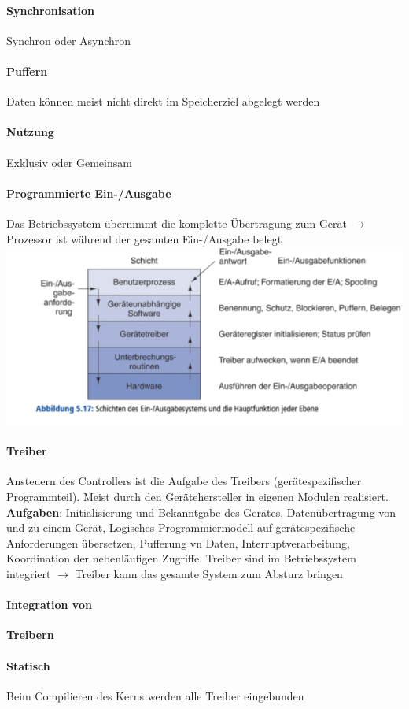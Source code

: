 \documentclass[11pt,a4paper,landscape]{article}
\begin{document}
\begin{multicols*}{3}
	\paragraph{Synchronisation} Synchron oder Asynchron
	\paragraph{Puffern} Daten können meist nicht direkt im Speicherziel abgelegt werden
	\paragraph{Nutzung} Exklusiv oder Gemeinsam
	\paragraph{Programmierte Ein-/Ausgabe} Das Betriebssystem übernimmt die komplette Übertragung zum Gerät $\rightarrow$ Prozessor ist während der gesamten Ein-/Ausgabe belegt\\
	\includegraphics[width=0.95\columnwidth]{einausgabe}
	\paragraph{Treiber} Ansteuern des Controllers ist die Aufgabe des Treibers (gerätespezifischer Programmteil). Meist durch den Gerätehersteller in eigenen Modulen realisiert. \textbf{Aufgaben}: Initialisierung und Bekanntgabe des Gerätes, Datenübertragung von und zu einem Gerät, Logisches Programmiermodell auf gerätespezifische Anforderungen übersetzen, Pufferung vn Daten, Interruptverarbeitung, Koordination der nebenläufigen Zugriffe. Treiber sind im Betriebssystem integriert $\rightarrow$ Treiber kann das gesamte System zum Absturz bringen
	\paragraph{Integration von} \textbf{Treibern}
	\paragraph{Statisch} Beim Compilieren des Kerns werden alle Treiber eingebunden

\end{multicols*}
\end{document}

